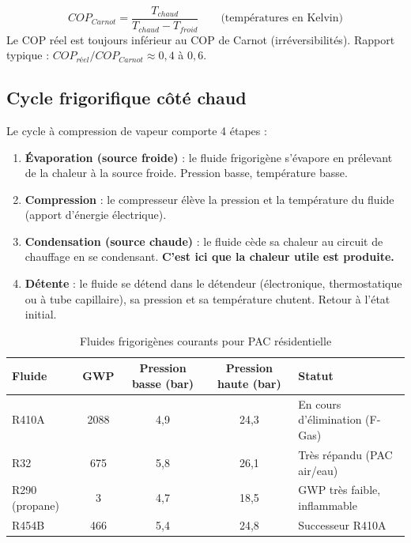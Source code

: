 \begin{definition}[title=COP de Carnot (COP maximal théorique)]
\begin{equation}
  COP_{Carnot} = \frac{T_{chaud}}{T_{chaud} - T_{froid}} \qquad \text{(températures en Kelvin)}
  \label{eq:cop_carnot}
\end{equation}
Le COP réel est toujours inférieur au COP de Carnot (irréversibilités). Rapport typique : $COP_{réel} / COP_{Carnot} \approx 0{,}4$ à $0{,}6$.
\end{definition}

\subsection{Cycle frigorifique côté chaud}

Le cycle à compression de vapeur comporte 4 étapes :

\begin{enumerate}
  \item \textbf{Évaporation (source froide)} : le fluide frigorigène s'évapore en prélevant de la chaleur à la source froide. Pression basse, température basse.
  \item \textbf{Compression} : le compresseur élève la pression et la température du fluide (apport d'énergie électrique).
  \item \textbf{Condensation (source chaude)} : le fluide cède sa chaleur au circuit de chauffage en se condensant. \textbf{C'est ici que la chaleur utile est produite.}
  \item \textbf{Détente} : le fluide se détend dans le détendeur (électronique, thermostatique ou à tube capillaire), sa pression et sa température chutent. Retour à l'état initial.
\end{enumerate}

\begin{table}[H]
  \centering
  \caption{Fluides frigorigènes courants pour PAC résidentielle}
  \begin{tabular}{lcccl}
    \toprule
    Fluide & GWP & Pression basse (bar) & Pression haute (bar) & Statut \\
    \midrule
    R410A & 2088 & 4,9 & 24,3 & En cours d'élimination (F-Gas) \\
    R32 & 675 & 5,8 & 26,1 & Très répandu (PAC air/eau) \\
    R290 (propane) & 3 & 4,7 & 18,5 & GWP très faible, inflammable \\
    R454B & 466 & 5,4 & 24,8 & Successeur R410A \\
    \bottomrule
  \end{tabular}
\end{table}

